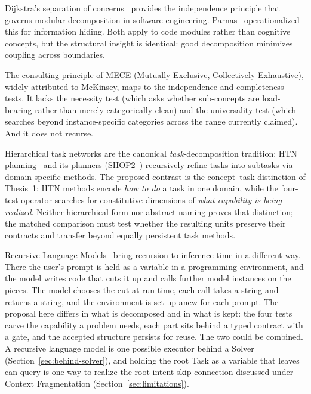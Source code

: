 \documentclass[11pt]{article}
\begin{document}
Dijkstra's separation of concerns~\cite{dijkstra1982} provides the independence principle that governs modular decomposition in software engineering. Parnas~\cite{parnas1972} operationalized this for information hiding. Both apply to code modules rather than cognitive concepts, but the structural insight is identical: good decomposition minimizes coupling across boundaries.

The consulting principle of MECE (Mutually Exclusive, Collectively Exhaustive), widely attributed to McKinsey, maps to the independence and completeness tests. It lacks the necessity test (which asks whether sub-concepts are load-bearing rather than merely categorically clean) and the universality test (which searches beyond instance-specific categories across the range currently claimed). And it does not recurse.

Hierarchical task networks are the canonical \emph{task}-decomposition tradition: HTN planning~\cite{erol1994htn} and its planners (SHOP2~\cite{nau2003shop2}) recursively refine tasks into subtasks via domain-specific methods. The proposed contrast is the concept--task distinction of Thesis~1: HTN methods encode \emph{how to do} a task in one domain, while the four-test operator searches for constitutive dimensions of \emph{what capability is being realized}. Neither hierarchical form nor abstract naming proves that distinction; the matched comparison must test whether the resulting units preserve their contracts and transfer beyond equally persistent task methods.

Recursive Language Models~\cite{zhang2025rlm} bring recursion to inference time in a different way. There the user's prompt is held as a variable in a programming environment, and the model writes code that cuts it up and calls further model instances on the pieces. The model chooses the cut at run time, each call takes a string and returns a string, and the environment is set up anew for each prompt. The proposal here differs in what is decomposed and in what is kept: the four tests carve the capability a problem needs, each part sits behind a typed contract with a gate, and the accepted structure persists for reuse. The two could be combined. A recursive language model is one possible executor behind a Solver (Section~\ref{sec:behind-solver}), and holding the root Task as a variable that leaves can query is one way to realize the root-intent skip-connection discussed under Context Fragmentation (Section~\ref{sec:limitations}).
\end{document}

